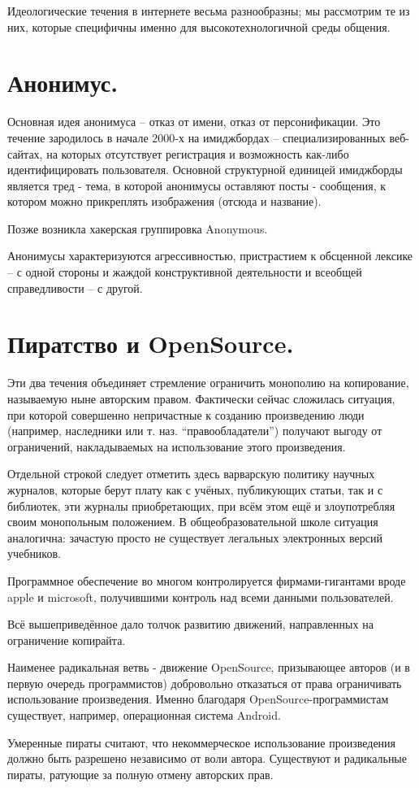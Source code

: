 Идеологические течения в интернете весьма разнообразны; мы рассмотрим те из них, которые специфичны именно для высокотехнологичной среды общения.

\section{Анонимус.}

Основная идея анонимуса -- отказ от имени, отказ от персонификации. Это течение зародилось в начале 2000-х на имиджбордах -- специализированных веб-сайтах, на которых отсутствует регистрация и возможность как-либо идентифицировать пользователя. Основной структурной единицей имиджборды является тред - тема, в которой анонимусы оставляют посты - сообщения, к котором можно прикреплять изображения (отсюда и название).

Позже возникла хакерская группировка Anonymous.

Анонимусы характеризуются агрессивностью, пристрастием к обсценной лексике -- с одной стороны и жаждой конструктивной деятельности и всеобщей справедливости -- с другой.


\section{Пиратство и OpenSource.}

Эти два течения объединяет стремление ограничить монополию на копирование, называемую ныне авторским правом. Фактически сейчас сложилась ситуация, при которой совершенно непричастные к созданию произведению люди (например, наследники или т. наз. ``правообладатели'') получают выгоду от ограничений, накладываемых на использование этого произведения.

Отдельной строкой следует отметить здесь варварскую политику научных журналов, которые берут плату как с учёных, публикующих статьи, так и с библиотек, эти журналы приобретающих, при всём этом ещё и злоупотребляя своим монопольным положением. В общеобразовательной школе ситуация аналогична: зачастую просто не существует легальных электронных версий учебников.

Программное обеспечение во многом контролируется фирмами-гигантами вроде apple и microsoft, получившими контроль над всеми данными пользователей.

Всё вышеприведённое дало толчок развитию движений, направленных на ограничение копирайта.

Наименее радикальная ветвь - движение OpenSource, призывающее авторов (и в первую очередь программистов) добровольно отказаться от права ограничивать использование произведения. Именно благодаря OpenSource-программистам существует, например, операционная система Android.

Умеренные пираты считают, что некоммерческое использование произведения должно быть разрешено независимо от воли автора. Существуют и радикальные пираты, ратующие за полную отмену авторских прав.
 
